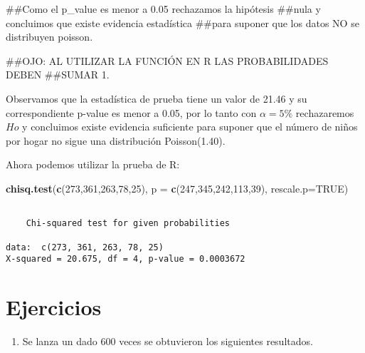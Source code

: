 \documentclass[a4paper,oneside,openany]{book}
\newenvironment{Shaded}{\begin{snugshade}}{\end{snugshade}}
\newcommand{\KeywordTok}[1]{\textcolor[rgb]{0.13,0.29,0.53}{\textbf{#1}}}
\newcommand{\DataTypeTok}[1]{\textcolor[rgb]{0.13,0.29,0.53}{#1}}
\newcommand{\DecValTok}[1]{\textcolor[rgb]{0.00,0.00,0.81}{#1}}
\newcommand{\OtherTok}[1]{\textcolor[rgb]{0.56,0.35,0.01}{#1}}
\newcommand{\NormalTok}[1]{#1}
\providecommand{\tightlist}{%
  \setlength{\itemsep}{0pt}\setlength{\parskip}{0pt}}
\begin{document}
\begin{Shaded}
\begin{Highlighting}[]
\NormalTok{##Como el p_value es menor a 0.05  rechazamos la hipótesis}
\NormalTok{##nula y concluimos que existe evidencia estadística}
\NormalTok{##para suponer que los datos NO se distribuyen poisson.}


\NormalTok{##OJO: AL UTILIZAR LA FUNCIÓN EN R LAS PROBABILIDADES DEBEN}
\NormalTok{##SUMAR 1.}
\end{Highlighting}
\end{Shaded}

Observamos que la estadística de prueba tiene un valor de 21.46 y su
correspondiente p-value es menor a 0.05, por lo tanto con \(\alpha=5\%\)
rechazaremos \(Ho\) y concluimos existe evidencia suficiente para
suponer que el número de niños por hogar no sigue una distribución
Poisson(1.40).

Ahora podemos utilizar la prueba de R:

\begin{Shaded}
\begin{Highlighting}[]
\KeywordTok{chisq.test}\NormalTok{(}\KeywordTok{c}\NormalTok{(}\DecValTok{273}\NormalTok{,}\DecValTok{361}\NormalTok{,}\DecValTok{263}\NormalTok{,}\DecValTok{78}\NormalTok{,}\DecValTok{25}\NormalTok{), }\DataTypeTok{p =} \KeywordTok{c}\NormalTok{(}\DecValTok{247}\NormalTok{,}\DecValTok{345}\NormalTok{,}\DecValTok{242}\NormalTok{,}\DecValTok{113}\NormalTok{,}\DecValTok{39}\NormalTok{), }
           \DataTypeTok{rescale.p=}\OtherTok{TRUE}\NormalTok{)}
\end{Highlighting}
\end{Shaded}

\begin{verbatim}

    Chi-squared test for given probabilities

data:  c(273, 361, 263, 78, 25)
X-squared = 20.675, df = 4, p-value = 0.0003672
\end{verbatim}

\section{Ejercicios}\label{ejercicios-13}

\begin{enumerate}
\def\labelenumi{\arabic{enumi}.}
\tightlist
\item
  Se lanza un dado 600 veces se obtuvieron los siguientes resultados.
\end{enumerate}
\end{document}
